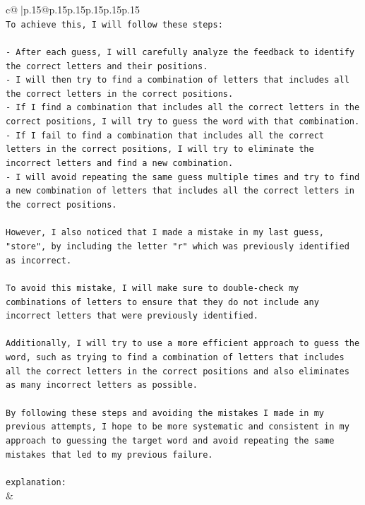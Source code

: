 \documentclass{article}
\begin{document}
{\begin{supertabular}{c@{$\;$}|p{.15\linewidth}@{}p{.15\linewidth}p{.15\linewidth}p{.15\linewidth}p{.15\linewidth}p{.15\linewidth}}
{{{\\ 
\texttt{To achieve this, I will follow these steps:} \\
\\ 
\texttt{{-} After each guess, I will carefully analyze the feedback to identify the correct letters and their positions.} \\
\texttt{{-} I will then try to find a combination of letters that includes all the correct letters in the correct positions.} \\
\texttt{{-} If I find a combination that includes all the correct letters in the correct positions, I will try to guess the word with that combination.} \\
\texttt{{-} If I fail to find a combination that includes all the correct letters in the correct positions, I will try to eliminate the incorrect letters and find a new combination.} \\
\texttt{{-} I will avoid repeating the same guess multiple times and try to find a new combination of letters that includes all the correct letters in the correct positions.} \\
\\ 
\texttt{However, I also noticed that I made a mistake in my last guess, "store", by including the letter "r" which was previously identified as incorrect. } \\
\\ 
\texttt{To avoid this mistake, I will make sure to double{-}check my combinations of letters to ensure that they do not include any incorrect letters that were previously identified. } \\
\\ 
\texttt{Additionally, I will try to use a more efficient approach to guess the word, such as trying to find a combination of letters that includes all the correct letters in the correct positions and also eliminates as many incorrect letters as possible. } \\
\\ 
\texttt{By following these steps and avoiding the mistakes I made in my previous attempts, I hope to be more systematic and consistent in my approach to guessing the target word and avoid repeating the same mistakes that led to my previous failure.} \\
\\ 
\texttt{explanation:} \\
            }
        }
    }
    & \\ \\

\end{supertabular}
}
\end{document}

